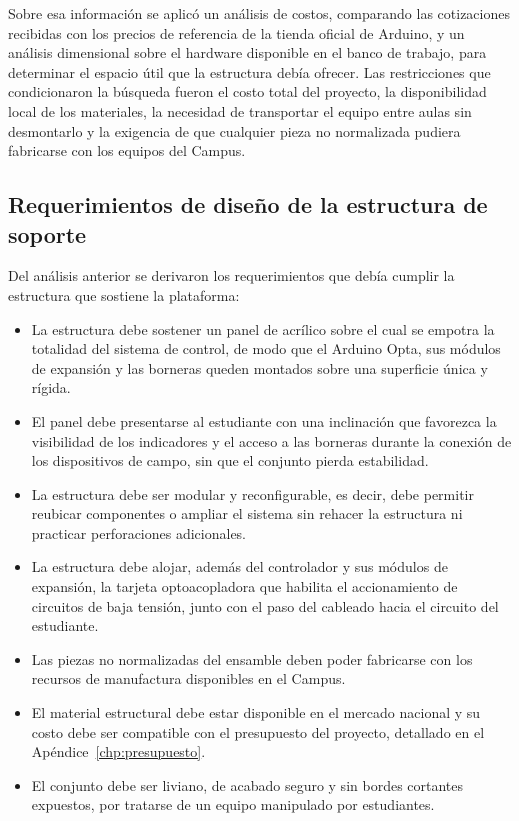 \documentclass[12pt,a4paper,oneside]{report}
\begin{document}
Sobre esa información se aplicó un análisis de costos, comparando las cotizaciones recibidas con los precios de referencia de la tienda oficial de Arduino, y un análisis dimensional sobre el hardware disponible en el banco de trabajo, para determinar el espacio útil que la estructura debía ofrecer. Las restricciones que condicionaron la búsqueda fueron el costo total del proyecto, la disponibilidad local de los materiales, la necesidad de transportar el equipo entre aulas sin desmontarlo y la exigencia de que cualquier pieza no normalizada pudiera fabricarse con los equipos del Campus.

\subsection{Requerimientos de diseño de la estructura de soporte}
\label{subsec:requerimientos}

Del análisis anterior se derivaron los requerimientos que debía cumplir la estructura que sostiene la plataforma:

\begin{itemize}
    \item La estructura debe sostener un panel de acrílico sobre el cual se empotra la totalidad del sistema de control, de modo que el Arduino Opta, sus módulos de expansión y las borneras queden montados sobre una superficie única y rígida.
    \item El panel debe presentarse al estudiante con una inclinación que favorezca la visibilidad de los indicadores y el acceso a las borneras durante la conexión de los dispositivos de campo, sin que el conjunto pierda estabilidad.
    \item La estructura debe ser modular y reconfigurable, es decir, debe permitir reubicar componentes o ampliar el sistema sin rehacer la estructura ni practicar perforaciones adicionales.

    \item La estructura debe alojar, además del controlador y sus módulos de expansión, la tarjeta optoacopladora que habilita el accionamiento de circuitos de baja tensión, junto con el paso del cableado hacia el circuito del estudiante.
    \item Las piezas no normalizadas del ensamble deben poder fabricarse con los recursos de manufactura disponibles en el Campus.
    \item El material estructural debe estar disponible en el mercado nacional y su costo debe ser compatible con el presupuesto del proyecto, detallado en el Apéndice~\ref{chp:presupuesto}.
    \item El conjunto debe ser liviano, de acabado seguro y sin bordes cortantes expuestos, por tratarse de un equipo manipulado por estudiantes.
\end{itemize}
\end{document}
